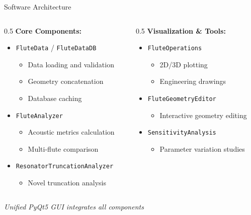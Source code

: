 \documentclass[aspectratio=169,10pt]{beamer}
\begin{document}
\begin{frame}{Software Architecture}
\begin{columns}
\begin{column}{0.5\textwidth}
\textbf{Core Components:}
\begin{itemize}
    \item \texttt{FluteData} / \texttt{FluteDataDB}
    \begin{itemize}
        \item Data loading and validation
        \item Geometry concatenation
        \item Database caching
    \end{itemize}
    \item \texttt{FluteAnalyzer}
    \begin{itemize}
        \item Acoustic metrics calculation
        \item Multi-flute comparison
    \end{itemize}
    \item \texttt{ResonatorTruncationAnalyzer}
    \begin{itemize}
        \item Novel truncation analysis
    \end{itemize}
\end{itemize}
\end{column}
\begin{column}{0.5\textwidth}
\textbf{Visualization \& Tools:}
\begin{itemize}
    \item \texttt{FluteOperations}
    \begin{itemize}
        \item 2D/3D plotting
        \item Engineering drawings
    \end{itemize}
    \item \texttt{FluteGeometryEditor}
    \begin{itemize}
        \item Interactive geometry editing
    \end{itemize}
    \item \texttt{SensitivityAnalysis}
    \begin{itemize}
        \item Parameter variation studies
    \end{itemize}
\end{itemize}
\end{column}
\end{columns}

\vspace{0.3cm}
\begin{center}
\textit{Unified PyQt5 GUI integrates all components}
\end{center}
\end{frame}
\end{document}
